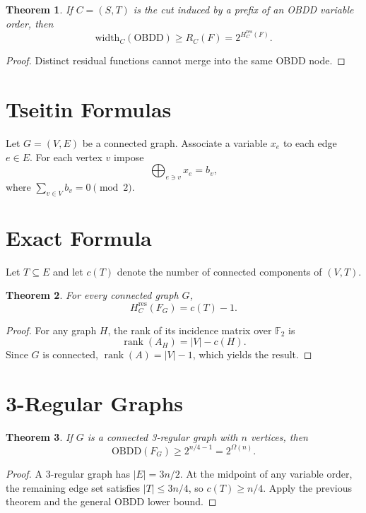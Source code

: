 \documentclass[11pt]{article}
\newtheorem{theorem}{Theorem}
\newcommand{\RCE}{H^{\mathrm{res}}}
\newcommand{\OBDD}{\mathrm{OBDD}}
\newcommand{\rank}{\operatorname{rank}}
\begin{document}
\begin{theorem}
If $C=(S,T)$ is the cut induced by a prefix of an OBDD variable order, then
\[
\text{width}_C(\OBDD) \ge R_C(F)=2^{\RCE_C(F)}.
\]
\end{theorem}

\begin{proof}
Distinct residual functions cannot merge into the same OBDD node.
\end{proof}

\section{Tseitin Formulas}

Let $G=(V,E)$ be a connected graph. Associate a variable $x_e$ to each edge $e \in E$. For each vertex $v$ impose
\[
\bigoplus_{e \ni v} x_e = b_v,
\]
where $\sum_{v\in V} b_v = 0 \pmod 2$.

\section{Exact Formula}

Let $T \subseteq E$ and let $c(T)$ denote the number of connected components of $(V,T)$.

\begin{theorem}
For every connected graph $G$,
\[
\RCE_C(F_G)=c(T)-1.
\]
\end{theorem}

\begin{proof}
For any graph $H$, the rank of its incidence matrix over $\mathbb{F}_2$ is
\[
\rank(A_H)=|V|-c(H).
\]
Since $G$ is connected, $\rank(A)=|V|-1$, which yields the result.
\end{proof}

\section{3-Regular Graphs}

\begin{theorem}
If $G$ is a connected 3-regular graph with $n$ vertices, then
\[
\OBDD(F_G)\ge 2^{n/4-1}=2^{\Omega(n)}.
\]
\end{theorem}

\begin{proof}
A 3-regular graph has $|E|=3n/2$. At the midpoint of any variable order, the remaining edge set satisfies $|T|\le 3n/4$, so $c(T)\ge n/4$. Apply the previous theorem and the general OBDD lower bound.
\end{proof}
\end{document}
